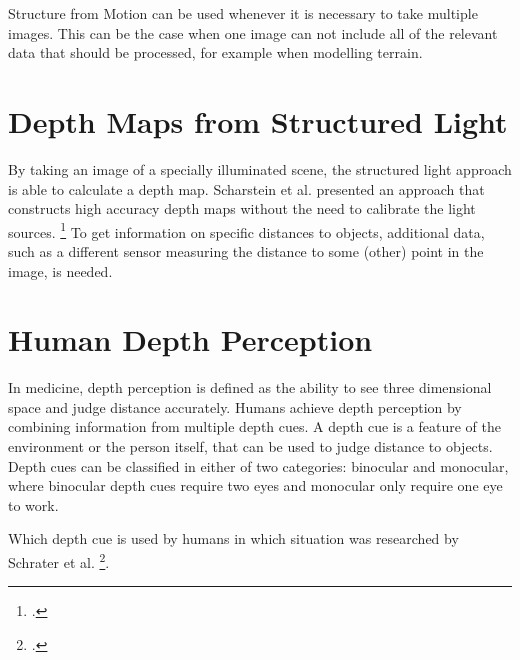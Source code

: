 Structure from Motion can be used whenever it is necessary to take multiple images. This can be the case when one image can not include all of the relevant data that should be processed, for example when modelling terrain.

\newpage

\section{Depth Maps from Structured Light}
By taking an image of a specially illuminated scene, the structured light approach is able to calculate a depth map. Scharstein et al. presented an approach that constructs high accuracy depth maps without the need to calibrate the light sources. \footcite{Scharstein_High-accuracy_stereo_depth_maps_using_structured_light} To get information on specific distances to objects, additional data, such as a different sensor measuring the distance to some (other) point in the image, is needed.

\section{Human Depth Perception}
\label{sec:studyOfLiterature_humanDepthPerception}

In medicine, depth perception is defined as the ability to see three dimensional space and judge distance accurately. Humans achieve depth perception by combining information from multiple depth cues. A depth cue is a feature of the environment or the person itself, that can be used to judge distance to objects. Depth cues can be classified in either of two categories: binocular and monocular, where binocular depth cues require two eyes and monocular only require one eye to work.

Which depth cue is used by humans in which situation was researched by Schrater et al. \footcite{Schrater_How_optimal_depth_cue_integration_depends_on_the_task}.

